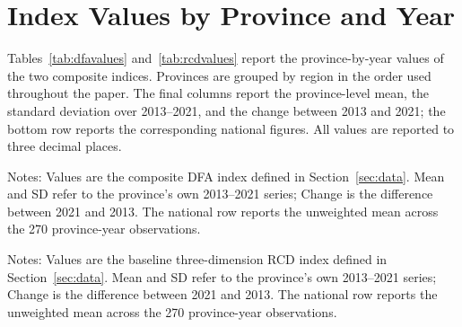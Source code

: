 \documentclass[economies,article,submit]{Definitions/mdpi}
\renewcommand{\arraystretch}{0.95}
\begin{document}
\section{Index Values by Province and Year}\label{app:values}

Tables~\ref{tab:dfavalues} and~\ref{tab:rcdvalues} report the province-by-year values of the two composite indices. Provinces are grouped by region in the order used throughout the paper. The final columns report the province-level mean, the standard deviation over 2013--2021, and the change between 2013 and 2021; the bottom row reports the corresponding national figures. All values are reported to three decimal places.

\begin{table}[H]
\caption{Digital factor allocation (DFA) index values by province and year.}\label{tab:dfavalues}
\begin{threeparttable}
\scriptsize
\setlength{\tabcolsep}{3pt}
\renewcommand{\arraystretch}{0.86}

\begin{tablenotes}
\footnotesize
\item Notes: Values are the composite DFA index defined in Section~\ref{sec:data}. Mean and SD refer to the province's own 2013--2021 series; Change is the difference between 2021 and 2013. The national row reports the unweighted mean across the 270 province-year observations.
\end{tablenotes}
\end{threeparttable}
\end{table}

\begin{table}[H]
\caption{Regional coordinated development (RCD) index values by province and year.}\label{tab:rcdvalues}
\begin{threeparttable}
\scriptsize
\setlength{\tabcolsep}{3pt}
\renewcommand{\arraystretch}{0.86}

\begin{tablenotes}
\footnotesize
\item Notes: Values are the baseline three-dimension RCD index defined in Section~\ref{sec:data}. Mean and SD refer to the province's own 2013--2021 series; Change is the difference between 2021 and 2013. The national row reports the unweighted mean across the 270 province-year observations.
\end{tablenotes}
\end{threeparttable}
\end{table}
\end{document}
